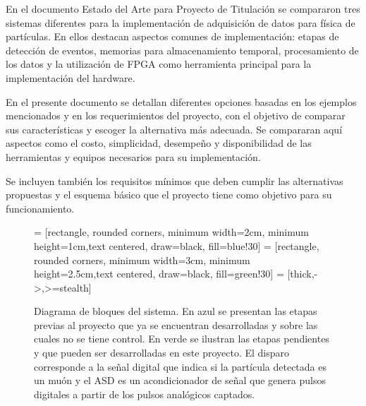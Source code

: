 \par En el documento Estado del Arte para Proyecto de Titulación \cite{Gonzalez2020EstadoTitulacion} se compararon tres sistemas diferentes para la implementación de adquisición de datos para física de partículas. En ellos destacan aspectos comunes de implementación: etapas de detección de eventos, memorias para almacenamiento temporal, procesamiento de los datos y la utilización de FPGA como herramienta principal para la implementación del hardware.

\par En el presente documento se detallan diferentes opciones basadas en los ejemplos mencionados y en los requerimientos del proyecto, con el objetivo de comparar sus características y escoger la alternativa más adecuada. Se compararan aquí aspectos como el costo, simplicidad, desempeño y disponibilidad de las herramientas y equipos necesarios para su implementación.

\par Se incluyen también los requisitos mínimos que deben cumplir las alternativas propuestas y el esquema básico que el proyecto tiene como objetivo para su funcionamiento.

\begin{figure}[H]
    \centering
    
     = [rectangle, rounded corners, minimum width=2cm, minimum height=1cm,text centered, draw=black, fill=blue!30]
     = [rectangle, rounded corners, minimum width=3cm, minimum height=2.5cm,text centered, draw=black, fill=green!30]
     = [thick,->,>=stealth]   
    

    \caption{Diagrama de bloques del sistema. En azul se presentan las etapas previas al proyecto que ya se encuentran desarrolladas y sobre las cuales no se tiene control. En verde se ilustran las etapas pendientes y que pueden ser desarrolladas en este proyecto. El disparo corresponde a la señal digital que indica si la partícula detectada es un muón y el ASD es un acondicionador de señal que genera pulsos digitales a partir de los pulsos analógicos captados.}
    \label{fig:diagrama}
\end{figure}

